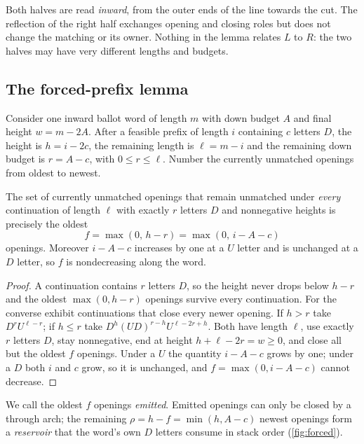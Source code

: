 Both halves are read \emph{inward}, from the outer ends of the line towards the
cut. The reflection of the right half exchanges opening and closing roles but
does not change the matching or its owner. Nothing in the lemma relates $L$ to
$R$: the two halves may have very different lengths and budgets.

\subsection{The forced-prefix lemma}

Consider one inward ballot word of length $m$ with down budget $A$ and final
height $w=m-2A$. After a feasible prefix of length $i$ containing $c$ letters
$D$, the height is $h=i-2c$, the remaining length is $\ell=m-i$ and the
remaining down budget is $r=A-c$, with $0\le r\le\ell$. Number the currently
unmatched openings from oldest to newest.

\begin{lemma}
\label{lem:forced}
\leanok
{}
The set of currently unmatched openings that remain unmatched under
\emph{every} continuation of length $\ell$ with exactly $r$ letters $D$ and
nonnegative heights is precisely the oldest
\[
 f=\max(0,\,h-r)=\max(0,\,i-A-c)
\]
openings. Moreover $i-A-c$ increases by one at a $U$ letter and is unchanged
at a $D$ letter, so $f$ is nondecreasing along the word.
\end{lemma}

\begin{proof}
\leanok
A continuation contains $r$ letters $D$, so the height never drops below
$h-r$ and the oldest $\max(0,h-r)$ openings survive every continuation. For the
converse exhibit continuations that close every newer opening. If $h>r$ take
$D^{r}U^{\ell-r}$; if $h\le r$ take $D^{h}(UD)^{r-h}U^{\ell-2r+h}$. Both have
length $\ell$, use exactly $r$ letters $D$, stay nonnegative, end at height
$h+\ell-2r=w\ge0$, and close all but the oldest $f$ openings. Under a $U$ the
quantity $i-A-c$ grows by one; under a $D$ both $i$ and $c$ grow, so it is
unchanged, and $f=\max(0,i-A-c)$ cannot decrease.
\end{proof}

We call the oldest $f$ openings \emph{emitted}. Emitted openings can only be
closed by a through arch; the remaining $\rho=h-f=\min(h,A-c)$ newest openings
form a \emph{reservoir} that the word's own $D$ letters consume in stack order (\cref{fig:forced}).

